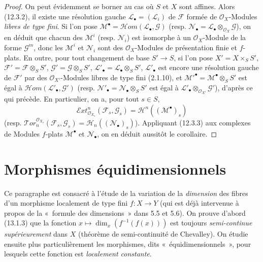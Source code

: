 \begin{proof}
On peut évidemment se borner au cas où $S$ et $X$ sont affines. Alors (12.3.2),
il existe une résolution gauche $\mathcal L_\bullet=(\mathcal L_i)$ de
$\mathcal F$ formée de $\mathcal O_X$-Modules \emph{libres de type fini}. Si
l'on pose $\mathcal M^\bullet=\mathscr{H}\!om(\mathcal L_\bullet,\mathcal G)$
(resp. $\mathcal N_\bullet=\mathcal L_\bullet\otimes_{\mathcal O_X}\mathcal G$),
on en déduit que chacun des $\mathcal M^i$ (resp. $\mathcal N_i$) est isomorphe
à un $\mathcal O_X$-Module de la forme $\mathcal G^m$, donc les $\mathcal M^i$
et $\mathcal N_i$ sont des $\mathcal O_X$-Modules de présentation finie et
$f$-plats. En outre, pour tout changement de base $S'\to S$, si l'on pose
$X'=X\times_SS'$, $\mathcal F'=\mathcal F\otimes_SS'$,
$\mathcal G'=\mathcal G\otimes_SS'$, $\mathcal L'_\bullet
=\mathcal L_\bullet\otimes_SS'$, $\mathcal L'_\bullet$ est encore une
résolution gauche de $\mathcal F'$ par des $\mathcal O_{X'}$-Modules libres de
type fini (2.1.10), et $\mathcal M'^\bullet=\mathcal M^\bullet\otimes_SS'$ est
égal à $\mathscr{H}\!om(\mathcal L'_\bullet,\mathcal G')$ (resp.
$\mathcal N'_\bullet=\mathcal N_\bullet\otimes_SS'$ est égal à
$\mathcal L'_\bullet\otimes_{\mathcal O_{X'}}\mathcal G'$), d'après ce qui
précède. En particulier, on a, pour tout $s\in S$,
\[
  \mathscr{E}\!xt^n_{\mathcal O_{X_s}}(\mathcal F_s,\mathcal G_s)
  =\mathcal H^n((\mathcal M^\bullet)_s)
\]
(resp.
$\mathscr{T}\!or_n^{\mathcal O_{X_s}}(\mathcal F_s,\mathcal G_s)
=\mathcal H_n((\mathcal N_\bullet)_s)$). Appliquant (12.3.3) aux complexes de
Modules $f$-plats $\mathcal M^\bullet$ et $\mathcal N_\bullet$, on en déduit
aussitôt le corollaire.
\end{proof}


\section{Morphismes équidimensionnels}
\label{section:IV.13-fr}

Ce paragraphe est consacré à l'étude de la variation de la \emph{dimension}
des fibres d'un morphisme localement de type fini $f:X\to Y$ (qui est déjà
intervenue à propos de la «~formule des dimensions~» dans 5.5 et 5.6). On
prouve d'abord (13.1.3) que la fonction
$x\mapsto\dim_x(f^{-1}(f(x)))$ est toujours \emph{semi-continue
supérieurement} dans $X$ (théorème de semi-continuité de Chevalley). On étudie
ensuite plus particulièrement les morphismes, dits «~équidimensionnels~», pour
lesquels cette fonction est \emph{localement constante}.

